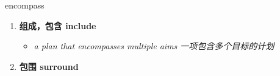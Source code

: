 
\begin{frame}
{\huge encompass}
\begin{center}
\begin{enumerate}\Large
  \item \textbf{组成，包含 include}
  \begin{itemize}
    \item \em{\Large{a plan that encompasses multiple aims 一项包含多个目标的计划}}
  \end{itemize}
  \item \textbf{包围 surround}
\end{enumerate}
\end{center}
\end{frame}
